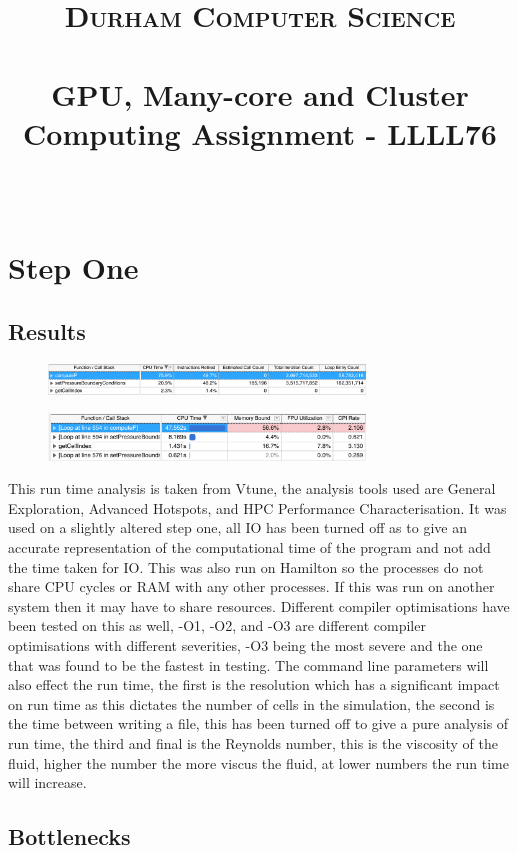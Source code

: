 \documentclass[paper=a4, fontsize=11pt]{scrartcl}
\date{}
\title{
		\vspace{-1in} 	
		\usefont{OT1}{bch}{b}{n}
		\normalfont \normalsize \textsc{Durham Computer Science} \\ [5pt]
		\horrule{0.5pt} \\[0.4cm]
		\large  GPU, Many-core and Cluster Computing Assignment - LLLL76\\
		\horrule{2pt} \\[0.5cm]
		\vspace{-1in} 	
}
\numberwithin{equation}{section}		%
\numberwithin{figure}{section}			%
\numberwithin{table}{section}				%
\begin{document}
\maketitle
\section{Step One}
\subsection{Results}
\begin{figure}[h]
\centering
\includegraphics[width=0.75\textwidth]{one.png}
\end{figure}
\begin{figure}[h]
\centering
\includegraphics[width=0.75\textwidth]{two.png}
\end{figure}

This run time analysis is taken from Vtune, the analysis tools used are General Exploration, Advanced Hotspots, and HPC Performance Characterisation. It was used on a slightly altered step one, all IO has been turned off as to give an accurate representation of the computational time of the program and not add the time taken for IO. This was also run on Hamilton so the processes do not share CPU cycles or RAM with any other processes. If this was run on another system then it may have to share resources. Different compiler optimisations have been tested on this as well, -O1, -O2, and -O3 are different compiler optimisations with different severities, -O3 being the most severe and the one that was found to be the fastest in testing.
The command line parameters will also effect the run time, the first is the resolution which has a significant impact on run time as this dictates the number of cells in the simulation, the second is the time between writing a file, this has been turned off to give a pure analysis of run time, the third and final is the Reynolds number, this is the viscosity of the fluid, higher the number the more viscus the fluid, at lower numbers the run time will increase.

\subsection{Bottlenecks}
\end{document}
